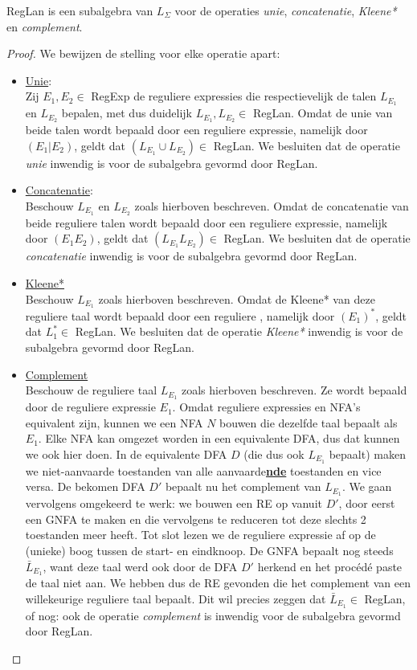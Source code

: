 \documentclass[../aanvullingen_cursus.tex]{subfiles}
\begin{document}
\begin{stelling}
	RegLan is een subalgebra van \(L_{\Sigma}\) voor de operaties \textit{unie}, \textit{concatenatie}, \textit{Kleene*} en \textit{complement}.
\end{stelling}

\begin{proof}
	We bewijzen de stelling voor elke operatie apart:

	\begin{itemize}

		\item \underline{Unie}:\\
		Zij \(E_1,E_2 \in \) RegExp de reguliere expressies die respectievelijk de talen \(L_{E_1}\) en \(L_{E_2}\) bepalen, met dus duidelijk \(L_{E_1},L_{E_2} \in \) RegLan. Omdat de unie van beide talen wordt bepaald door een reguliere expressie, namelijk door \((E_1|E_2)\), geldt dat \((L_{E_1}\cup L_{E_2}) \in \) RegLan. We besluiten dat de operatie \textit{unie} inwendig is voor de subalgebra gevormd door RegLan.
		\item \underline{Concatenatie}:\\
		Beschouw \(L_{E_1}\) en \(L_{E_2}\) zoals hierboven beschreven. Omdat de concatenatie van beide reguliere talen wordt bepaald door een reguliere expressie, namelijk door \((E_1E_2)\), geldt dat \((L_{E_1}L_{E_2}) \in \) RegLan. We besluiten dat de operatie \textit{concatenatie} inwendig is voor de subalgebra gevormd door RegLan.
		\item \underline{Kleene*}\\
		Beschouw \(L_{E_1}\) zoals hierboven beschreven. Omdat de Kleene* van deze reguliere taal wordt bepaald door een reguliere , namelijk door \((E_1)^*\), geldt dat \(L_1^* \in\) RegLan. We besluiten dat de operatie \textit{Kleene*} inwendig is voor de subalgebra gevormd door RegLan.
		\item \underline{Complement}\\
		Beschouw de reguliere taal \(L_{E_1}\) zoals hierboven beschreven. Ze wordt bepaald door de reguliere expressie \(E_1\). Omdat reguliere expressies en NFA's equivalent zijn, kunnen we een NFA \(N\) bouwen die dezelfde taal bepaalt als \(E_1\). Elke NFA kan omgezet worden in een equivalente DFA, dus dat kunnen we ook hier doen. In de equivalente DFA \(D\) (die dus ook \(L_{E_1}\) bepaalt) maken we niet-aanvaarde toestanden van alle aanvaarde\underline{\textbf{nde}} toestanden en vice versa. De bekomen DFA \(D'\) bepaalt nu het complement van \(L_{E_1}\). We gaan vervolgens omgekeerd te werk: we bouwen een RE op vanuit \(D'\), door eerst een GNFA te maken en die vervolgens te reduceren tot deze slechts 2 toestanden meer heeft. Tot slot lezen we de reguliere expressie af op de (unieke) boog tussen de start- en eindknoop. De GNFA bepaalt nog steeds \(\bar{L}_{E_1}\), want deze taal werd ook door de DFA \(D'\) herkend en het procédé paste de taal niet aan. We hebben dus de RE gevonden die het complement van een willekeurige reguliere taal bepaalt. Dit wil precies zeggen dat \(\bar{L}_{E_1} \in \) RegLan, of nog: ook de operatie \textit{complement} is inwendig voor de subalgebra gevormd door RegLan.


\end{itemize}
\end{proof}
\end{document}
